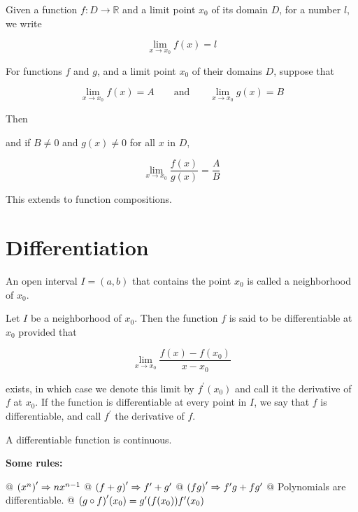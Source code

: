     \begin{definition}
        Given a function $f:D\to\mathbb{R}$ and a limit point $x_0$ of its domain $D$, for a number $l$, we write

        \[ \lim_{x\to x_0} f(x) = l \]
    \end{definition}

    \begin{thm}
        For functions $f$ and $g$, and a limit point $x_0$ of their domains $D$, suppose that

        \[ \lim_{x\to x_0} f(x) = A \qquad \text{and} \qquad \lim_{x \to x_0} g(x) = B \]

        Then

        and if $B \neq 0$ and $g(x) \neq 0$ for all $x$ in $D$,

        \[
            \lim_{x \to x_0} \frac{f(x)}{g(x)} = \frac{A}{B}
        \]
    \end{thm}

    This extends to function compositions.

\newpage
\section{Differentiation}

An open interval $I = (a, b)$ that contains the point $x_0$ is called a neighborhood of $x_0$.

\begin{definition}
    Let $I$ be a neighborhood of $x_0$. Then the function $f$ is said to be differentiable at $x_0$ provided that

    \[
        \lim_{x \to x_0} \frac{f(x) - f(x_0)}{x - x_0}
    \]

    exists, in which case we denote this limit by $f^\prime(x_0)$ and call it the derivative of $f$ at $x_0$. If the
    function is differentiable at every point in $I$, we say that $f$ is differentiable, and call $f^\prime$ the
    derivative of $f$.

    A differentiable function is continuous.
\end{definition}

\noindent \textbf{Some rules:}

\begin{easylist}[enumerate]
    @ ${\left( x^n \right)}^\prime \Rightarrow nx^{n-1}$
    @ ${\left( f+g \right)}^\prime \Rightarrow f^\prime + g^\prime$
    @ ${\left( fg \right)}^\prime \Rightarrow f^\prime g + f g^\prime$
    @ Polynomials are differentiable.
    @ ${\left( g \circ f \right)}^\prime (x_0) = g^\prime(f(x_0))f^\prime(x_0)$
\end{easylist}

